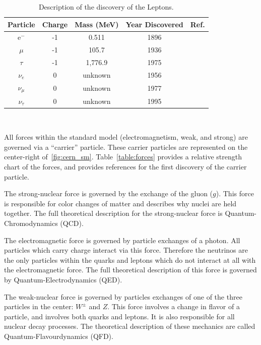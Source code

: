 \begin{table}
\begin{center}
\begin{tabular}{||c c c c c||}
 \hline
 Particle & Charge & Mass (MeV) & Year Discovered & Ref.\\ [0.5ex]
 \hline\hline
 e$^{-}$ & -1 & 0.511 & 1896 & \citep{doi:10.1080/14786449708621070} \\
 \hline
 $\mu$ & -1 & 105.7 & 1936 & \citep{muon_discovery_PhysRev.51.884} \\
 \hline
 $\tau$ & -1 & 1,776.9 & 1975 & \citep{tau_discovery_PhysRevLett.35.1489} \\
 \hline
 $\nu_{e}$ & 0 & unknown & 1956 & \citep{first_neutrino_measurement} \\
 \hline
 $\nu_{\mu}$ & 0 & unknown & 1977 & \citep{PhysRevLett.9.36} \\
 \hline
 $\nu_{\tau}$ & 0 & unknown & 1995 & \citep{tau_neutrino_discovery_KODAMA2001218} \\
 \hline
\end{tabular}
\caption{Description of the discovery of the Leptons.
}
\end{center}
\end{table}
~\label{table:lepton}

All forces within the standard model (electromagnetism, weak, and strong) are governed via a ``carrier'' particle.
These carrier particles are represented on the center-right of~\ref{fig:cern_sm}.
Table~\ref{table:forces} provides a relative strength chart of the forces, and provides references for the first discovery of the carrier particle.

The strong-nuclear force is governed by the exchange of the gluon ($g$).
This force is responsible for color changes of matter and describes why nuclei are held together.
The full theoretical description for the strong-nuclear force is Quantum-Chromodynamics (QCD).

The electromagnetic force is governed by particle exchanges of a photon.
All particles which carry charge interact via this force.
Therefore the neutrinos are the only particles within the quarks and leptons which do not interact at all with the electromagnetic force.
The full theoretical description of this force is governed by Quantum-Electrodynamics (QED).

The weak-nuclear force is governed by particles exchanges of one of the three particles in the center: $W^{\pm}$ and $Z$.
This force involves a change in flavor of a particle, and involves both quarks and leptons.
It is also responsible for all nuclear decay processes.
The theoretical description of these mechanics are called Quantum-Flavourdynamics (QFD).

